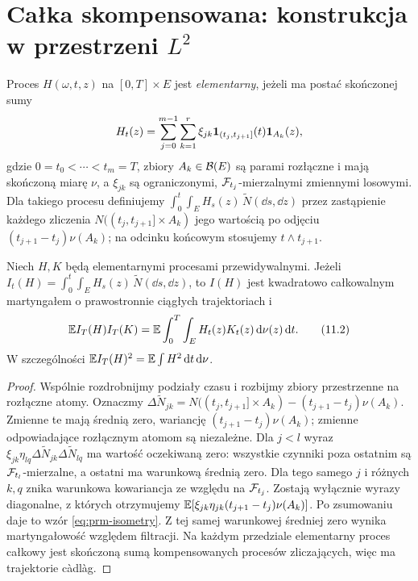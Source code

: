 \section[Całka skompensowana: konstrukcja w L2]{Całka skompensowana: konstrukcja w przestrzeni $L^2$}

\begin{definicja}
\label{def:prm-step}
Proces $H(\omega,t,z)$ na $[0,T]\times E$ jest
\emph{elementarny}, jeżeli ma postać skończonej sumy
\[
H_t(z)=\sum_{j=0}^{m-1}\sum_{k=1}^{r}
\xi_{jk}\mathbf{1}_{(t_j,t_{j+1}]}(t)\mathbf{1}_{A_k}(z),
\]
gdzie $0=t_0<\cdots<t_m=T$, zbiory $A_k\in\mathcal{B}(E)$
są parami rozłączne i mają skończoną miarę $\nu$,
a $\xi_{jk}$ są ograniczonymi, $\mathcal{F}_{t_j}$-mierzalnymi
zmiennymi losowymi. Dla takiego procesu definiujemy
$\int_0^t\int_EH_s(z)\,\widetilde N(\dd s,\dd z)$
przez zastąpienie każdego zliczenia $N((t_j,t_{j+1}]\times A_k)$
jego wartością po odjęciu $(t_{j+1}-t_j)\nu(A_k)$;
na odcinku końcowym stosujemy $t\wedge t_{j+1}$.
\end{definicja}

\begin{twierdzenie}
\label{th:prm-isometry}
Niech $H,K$ będą elementarnymi procesami przewidywalnymi.
Jeżeli $I_t(H)=\int_0^t\int_EH_s(z)\,\widetilde N(\dd s,\dd z)$,
to $I(H)$ jest kwadratowo całkowalnym martyngałem o
prawostronnie ciągłych trajektoriach i
\[
\mathbb{E} I_T(H)I_T(K)
=\mathbb{E}\int_0^T\int_E H_t(z)K_t(z)\,\mathrm{d}\nu(z)\,\mathrm{d} t.
\tag{11.2}\label{eq:prm-isometry}
\]
W szczególności $\mathbb{E} I_T(H)^2=\mathbb{E}\int H^2\,\mathrm{d} t\,\mathrm{d}\nu$.
\end{twierdzenie}
\begin{proof}
Wspólnie rozdrobnijmy podziały czasu i rozbijmy zbiory
przestrzenne na rozłączne atomy. Oznaczmy
$\Delta\widetilde N_{jk}=N((t_j,t_{j+1}]\times A_k)
-(t_{j+1}-t_j)\nu(A_k)$.
Zmienne te mają średnią zero, wariancję
$(t_{j+1}-t_j)\nu(A_k)$; zmienne odpowiadające
rozłącznym atomom są niezależne. Dla $j<l$ wyraz
$\xi_{jk}\eta_{lq}\Delta\widetilde N_{jk}
\Delta\widetilde N_{lq}$ ma wartość oczekiwaną zero:
wszystkie czynniki poza ostatnim są $\mathcal{F}_{t_l}$-mierzalne,
a ostatni ma warunkową średnią zero. Dla tego samego $j$
i różnych $k,q$ znika warunkowa kowariancja ze względu
na $\mathcal{F}_{t_j}$. Zostają wyłącznie wyrazy diagonalne,
z których otrzymujemy
$\mathbb{E}[\xi_{jk}\eta_{jk}(t_{j+1}-t_j)\nu(A_k)]$.
Po zsumowaniu daje to wzór \eqref{eq:prm-isometry}.
Z tej samej warunkowej średniej zero wynika martyngałowość
względem filtracji. Na każdym przedziale elementarny
proces całkowy jest skończoną sumą kompensowanych
procesów zliczających, więc ma trajektorie càdlàg.
\end{proof}


